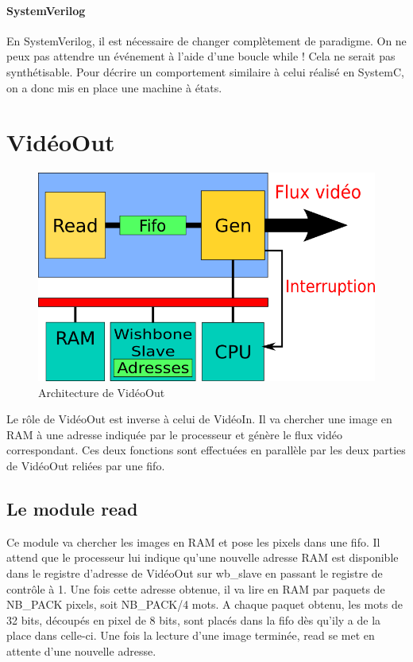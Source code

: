 \documentclass[a4paper,12pt]{report}
\begin{document}
\paragraph{SystemVerilog}
En SystemVerilog, il est nécessaire de changer complètement de paradigme. 
On ne peux pas attendre un événement à l'aide d'une boucle while ! 
Cela ne serait pas synthétisable.
Pour décrire un comportement similaire à celui réalisé en SystemC, on a donc mis en place une machine à états.







{}

\newpage
 
    \section*{VidéoOut}

\begin{figure}[!h]
	\centering
	\includegraphics[scale = 0.5]{video_out.png}
	\caption{Architecture de VidéoOut}
\end{figure}

Le rôle de VidéoOut est inverse à celui de VidéoIn.
Il va chercher une image en RAM à une adresse indiquée par le processeur
et génère le flux vidéo correspondant. 
Ces deux fonctions sont effectuées en parallèle par les deux parties de VidéoOut reliées par une fifo.

\subsection{Le module read}
Ce module va chercher les images en RAM et pose les pixels dans une fifo. 
Il attend que le processeur lui indique qu'une nouvelle adresse RAM est disponible dans le registre d'adresse de VidéoOut sur wb\_slave en passant le registre de contrôle à 1.
Une fois cette adresse obtenue, il va lire en RAM par paquets de NB\_PACK pixels, soit NB\_PACK/4 mots.
A chaque paquet obtenu, les mots de 32 bits, découpés en pixel de 8 bits, sont placés dans la fifo dès qu'ily a de la place dans celle-ci.
Une fois la lecture d'une image terminée, read se met en attente d'une nouvelle adresse.
\end{document}
